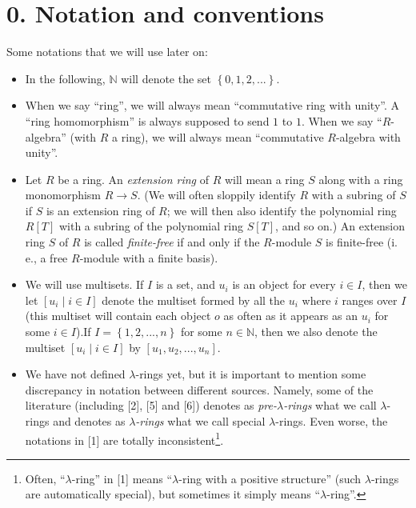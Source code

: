 \documentclass[numbers=enddot,12pt,final,onecolumn,notitlepage]{scrartcl}%
\begin{document}
\section*{0. Notation and conventions}

Some notations that we will use later on:

\begin{itemize}
\item In the following, $\mathbb{N}$ will denote the set $\left\{
0,1,2,...\right\}  $.

\item When we say ``ring'', we will always mean ``commutative ring with unity''. A
``ring homomorphism'' is always supposed to send $1$ to $1$. When we say
``$R$-algebra'' (with $R$ a ring), we will always mean ``commutative $R$-algebra
with unity''.

\item Let $R$ be a ring. An \textit{extension ring} of $R$ will mean a ring
$S$ along with a ring monomorphism $R\rightarrow S$. (We will often sloppily
identify $R$ with a subring of $S$ if $S$ is an extension ring of $R$; we will
then also identify the polynomial ring $R\left[  T\right]  $ with a subring of
the polynomial ring $S\left[  T\right]  $, and so on.) An extension ring $S$
of $R$ is called \textit{finite-free} if and only if the $R$-module $S$ is
finite-free (i. e., a free $R$-module with a finite basis).

\item We will use multisets. If $I$ is a set, and $u_{i}$ is an object for
every $i\in I$, then we let $\left[  u_{i}\mid i\in I\right]  $ denote the
multiset formed by all the $u_{i}$ where $i$ ranges over $I$ (this multiset
will contain each object $o$ as often as it appears as an $u_{i}$ for some
$i\in I$).\newline If $I=\left\{  1,2,...,n\right\}  $ for some $n\in
\mathbb{N}$, then we also denote the multiset $\left[  u_{i}\mid i\in
I\right]  $ by $\left[  u_{1},u_{2},...,u_{n}\right]  $.

\item We have not defined $\lambda$-rings yet, but it is important to mention
some discrepancy in notation between different sources. Namely, some of the
literature (including [2], [5] and [6]) denotes as \textit{pre-}$\lambda
$\textit{-rings} what we call $\lambda$-rings and denotes as $\lambda
$\textit{-rings} what we call special $\lambda$-rings. Even worse, the
notations in [1] are totally inconsistent\footnote{Often, ``$\lambda$-ring'' in
[1] means ``$\lambda$-ring with a positive structure'' (such $\lambda$-rings are
automatically special), but sometimes it simply means ``$\lambda$-ring''.}.


\end{itemize}
\end{document}
